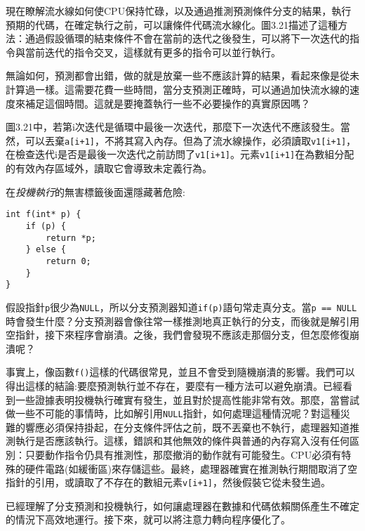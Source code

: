 

現在瞭解流水線如何使CPU保持忙碌，以及通過推測預測條件分支的結果，執行預期的代碼，在確定執行之前，可以讓條件代碼流水線化。圖3.21描述了這種方法：通過假設循環的結束條件不會在當前的迭代之後發生，可以將下一次迭代的指令與當前迭代的指令交叉，這樣就有更多的指令可以並行執行。

無論如何，預測都會出錯，做的就是放棄一些不應該計算的結果，看起來像是從未計算過一樣。這需要花費一些時間，當分支預測正確時，可以通過加快流水線的速度來補足這個時間。這就是要掩蓋執行一些不必要操作的真實原因嗎？

圖3.21中，若第i次迭代是循環中最後一次迭代，那麼下一次迭代不應該發生。當然，可以丟棄\texttt{a[i+1]}，不將其寫入內存。但為了流水線操作，必須讀取\texttt{v1[i+1]}，在檢查迭代i是否是最後一次迭代之前訪問了\texttt{v1[i+1]}。元素\texttt{v1[i+1]}在為數組分配的有效內存區域外，讀取它會導致未定義行為。

在\textit{投機執行}的無害標籤後面還隱藏著危險:

\begin{lstlisting}[style=styleCXX]
int f(int* p) {
	if (p) {
		return *p;
	} else {
		return 0;
	}
}
\end{lstlisting}

假設指針\texttt{p}很少為\texttt{NULL}，所以分支預測器知道\texttt{if(p)}語句常走真分支。當\texttt{p == NULL}時會發生什麼？分支預測器會像往常一樣推測地真正執行的分支，而後就是解引用空指針，接下來程序會崩潰。之後，我們會發現不應該走那個分支，但怎麼修復崩潰呢？

事實上，像函數\texttt{f()}這樣的代碼很常見，並且不會受到隨機崩潰的影響。我們可以得出這樣的結論:要麼預測執行並不存在，要麼有一種方法可以避免崩潰。已經看到一些證據表明投機執行確實有發生，並且對於提高性能非常有效。那麼，當嘗試做一些不可能的事情時，比如解引用\texttt{NULL}指針，如何處理這種情況呢？對這種災難的響應必須保持掛起，在分支條件評估之前，既不丟棄也不執行，處理器知道推測執行是否應該執行。這樣，錯誤和其他無效的條件與普通的內存寫入沒有任何區別：只要動作指令仍具有推測性，那麼撤消的動作就有可能發生。CPU必須有特殊的硬件電路(如緩衝區)來存儲這些。最終，處理器確實在推測執行期間取消了空指針的引用，或讀取了不存在的數組元素\texttt{v[i+1]}，然後假裝它從未發生過。

已經理解了分支預測和投機執行，如何讓處理器在數據和代碼依賴關係產生不確定的情況下高效地運行。接下來，就可以將注意力轉向程序優化了。





























































